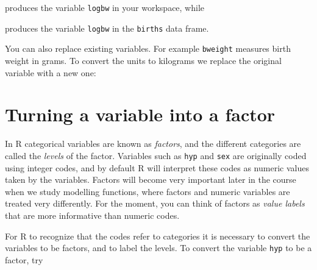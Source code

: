 \documentclass[
]{book}
\newenvironment{Shaded}{\begin{snugshade}}{\end{snugshade}}
\newcommand{\DecValTok}[1]{\textcolor[rgb]{0.00,0.00,0.81}{#1}}
\newcommand{\FunctionTok}[1]{\textcolor[rgb]{0.13,0.29,0.53}{\textbf{#1}}}
\newcommand{\NormalTok}[1]{#1}
\newcommand{\OtherTok}[1]{\textcolor[rgb]{0.56,0.35,0.01}{#1}}
\newcommand{\SpecialCharTok}[1]{\textcolor[rgb]{0.81,0.36,0.00}{\textbf{#1}}}
\begin{document}
\begin{Shaded}
\end{Shaded}

produces the variable \texttt{logbw} in your workspace, while

\begin{Shaded}
\end{Shaded}

produces the variable \texttt{logbw} in the \texttt{births} data frame.

You can also replace existing variables. For example \texttt{bweight} measures
birth weight in grams. To convert the units to kilograms we replace the
original variable with a new one:

\begin{Shaded}
\end{Shaded}

\section{Turning a variable into a factor}\label{turning-a-variable-into-a-factor}

In R categorical variables are known as \emph{factors}, and the
different categories are called the \emph{levels} of the factor.
Variables such as \texttt{hyp} and \texttt{sex} are originally coded using
integer codes, and by default R will interpret these codes as numeric
values taken by the variables. Factors will become very important
later in the course when we study modelling functions, where
factors and numeric variables are treated very differently. For the moment,
you can think of factors as \emph{value labels} that are more informative
than numeric codes.

For R to recognize that the codes refer to categories it is necessary
to convert the variables to be factors, and to label the levels. To
convert the variable \texttt{hyp} to be a factor, try
\end{document}

